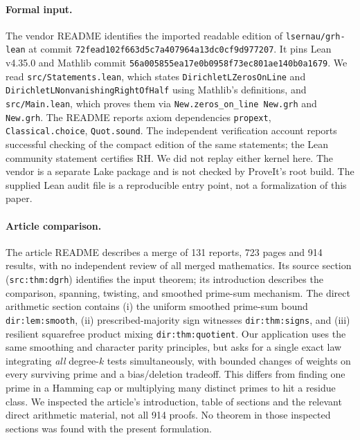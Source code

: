 \documentclass[11pt]{article}
\theoremstyle{remark}\newtheorem{remark}[theorem]{Remark}
\begin{document}
\paragraph{Formal input.} The vendor README \cite{vendor} identifies the imported readable edition of \texttt{lsernau/grh-lean} at commit \texttt{72fead102f663d5c7a407964a13dc0cf9d977207}. It pins Lean v4.35.0 and Mathlib commit \texttt{56a005855ea17e0b0958f73ec801ae140b0a1679}. We read \texttt{src/Statements.lean}, which states \texttt{DirichletLZerosOnLine} and \texttt{DirichletLNonvanishing}\allowbreak\texttt{RightOfHalf} using Mathlib's definitions, and \texttt{src/Main.lean}, which proves them via \texttt{New.zeros\_on\_line New.grh} and \texttt{New.grh}. The README reports axiom dependencies \texttt{propext}, \texttt{Classical.choice}, \texttt{Quot.sound}. The independent verification account \cite{waterloo} reports successful checking of the compact edition of the same statements; the Lean community statement \cite{leanblog} certifies RH. We did not replay either kernel here. The vendor is a separate Lake package and is not checked by ProveIt's root build. The supplied Lean audit file is a reproducible entry point, not a formalization of this paper.

\paragraph{Article comparison.} The article README describes a merge of 131 reports, 723 pages and 914 results, with no independent review of all merged mathematics. Its source section (\texttt{src:thm:dgrh}) identifies the input theorem; its introduction describes the comparison, spanning, twisting, and smoothed prime-sum mechanism. The direct arithmetic section contains (i) the uniform smoothed prime-sum bound \texttt{dir:lem:smooth}, (ii) prescribed-majority sign witnesses \texttt{dir:thm:signs}, and (iii) resilient squarefree product mixing \texttt{dir:thm:quotient}. Our application uses the same smoothing and character parity principles, but asks for a single exact law integrating \emph{all} degree-$k$ tests simultaneously, with bounded changes of weights on every surviving prime and a bias/deletion tradeoff. This differs from finding one prime in a Hamming cap or multiplying many distinct primes to hit a residue class. We inspected the article's introduction, table of sections and the relevant direct arithmetic material, not all 914 proofs. No theorem in those inspected sections was found with the present formulation.
\end{document}
